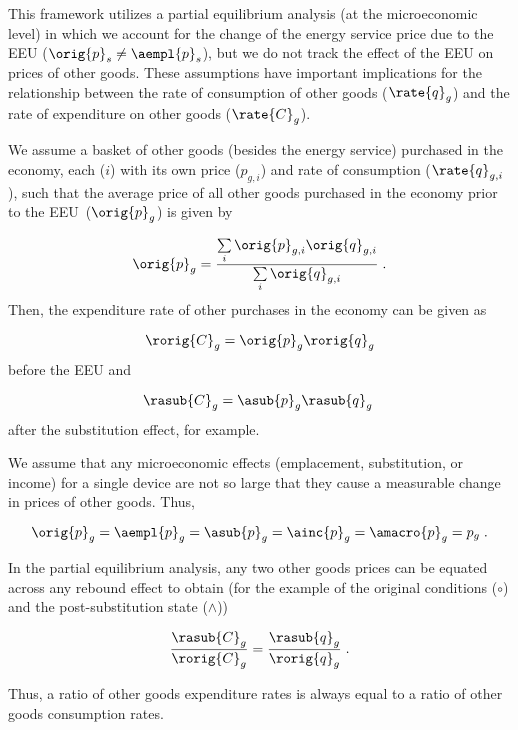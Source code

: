 

This framework utilizes
a partial equilibrium analysis (at the microeconomic level)
in which we account for the change of the energy service price
due to the EEU ($\orig{p}_s \neq \aempl{p}_s$), but 
we do not track the effect of the EEU on prices of other goods.
These assumptions have important implications for the relationship between 
the rate of consumption of other goods ($\rate{q}_g$) and 
the rate of expenditure on other goods ($\rate{C}_g$).

We assume a basket of other goods (besides the energy service) 
purchased in the economy,
each ($i$) with its own price ($p_{g,i}$) and rate of consumption ($\rate{q}_{g,i}$),
such that the average price of all other goods purchased in the economy
prior to the EEU~($\orig{p}_g$) is given by

\begin{equation}
  \orig{p}_g = \frac{\sum\limits_i \orig{p}_{g,i} \orig{q}_{g,i}}{\sum\limits_i \orig{q}_{g,i}} \; .
\end{equation}
%
Then, the expenditure rate of other purchases in the economy can be given as

\begin{equation}
  \rorig{C}_g = \orig{p}_g \rorig{q}_g
\end{equation}
%
before the EEU and

\begin{equation}
  \rasub{C}_g = \asub{p}_g \rasub{q}_g \; 
\end{equation}
%
after the substitution effect, for example.

We assume that any microeconomic effects
(emplacement, substitution, or income)
for a single device 
are not so large that they 
cause a measurable change in prices of other goods. 
Thus, 

\begin{equation}
  \orig{p}_g = \aempl{p}_g = \asub{p}_g = \ainc{p}_g = \amacro{p}_g  = p_g\; .
\end{equation}

In the partial equilibrium analysis, 
any two other goods prices can be equated 
across any rebound effect
to obtain
(for the example of the original conditions ($\circ$) 
and the post-substitution state ($\wedge$))

\begin{equation} \label{eq:qo_Co_equality}
  \frac{\rasub{C}_g}{\rorig{C}_g} 
      = \frac{\rasub{q}_g}{\rorig{q}_g} \; .
\end{equation}

Thus, a ratio of other goods expenditure rates
is always equal to a ratio of other goods consumption rates.










